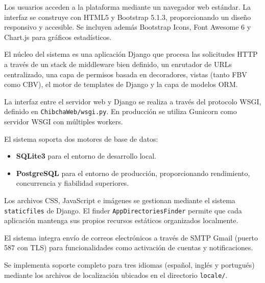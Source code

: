 \documentclass[12pt, a4paper]{article}
\begin{document}
\begin{description}[style=nextline]
    \item[Cliente (Navegador Web)]
    Los usuarios acceden a la plataforma mediante un navegador web estándar. La interfaz se construye con HTML5 y Bootstrap 5.1.3, proporcionando un diseño responsivo y accesible. Se incluyen además Bootstrap Icons, Font Awesome 6 y Chart.js para gráficos estadísticos.

    \item[Aplicación Django 5.2]
    El núcleo del sistema es una aplicación Django que procesa las solicitudes HTTP a través de un stack de middleware bien definido, un enrutador de URLs centralizado, una capa de permisos basada en decoradores, vistas (tanto FBV como CBV), el motor de templates de Django y la capa de modelos ORM.

    \item[WSGI Application]
    La interfaz entre el servidor web y Django se realiza a través del protocolo WSGI, definido en \texttt{ChibchaWeb/wsgi.py}. En producción se utiliza Gunicorn como servidor WSGI con múltiples workers.

    \item[Base de Datos]
    El sistema soporta dos motores de base de datos:
    \begin{itemize}
        \item \textbf{SQLite3} para el entorno de desarrollo local.
        \item \textbf{PostgreSQL} para el entorno de producción, proporcionando rendimiento, concurrencia y fiabilidad superiores.
    \end{itemize}

    \item[Archivos Estáticos]
    Los archivos CSS, JavaScript e imágenes se gestionan mediante el sistema \texttt{staticfiles} de Django. El finder \texttt{AppDirectoriesFinder} permite que cada aplicación mantenga sus propios recursos estáticos organizados localmente.

    \item[Servicio de Email]
    El sistema integra envío de correos electrónicos a través de SMTP Gmail (puerto 587 con TLS) para funcionalidades como activación de cuentas y notificaciones.

    \item[Internacionalización]
    Se implementa soporte completo para tres idiomas (español, inglés y portugués) mediante los archivos de localización ubicados en el directorio \texttt{locale/}.
\end{description}
\end{document}
